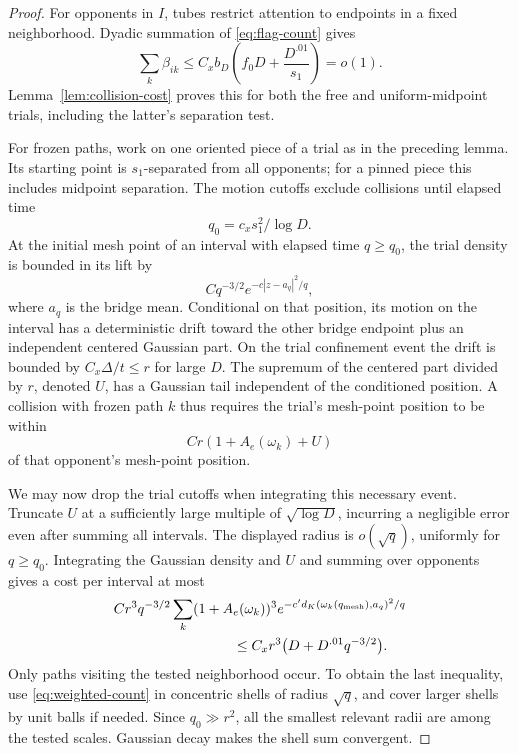 \begin{proof}
For opponents in $I$, tubes restrict attention to endpoints in a fixed
neighborhood.  Dyadic summation of \eqref{eq:flag-count} gives
\[
 \sum_k\beta_{ik}
       \le C_xb_D\left(f_0D+\frac{D^{.01}}{s_1}\right)=o(1).
\]
Lemma~\ref{lem:collision-cost} proves this for both the free and
uniform-midpoint trials, including the latter's separation test.

For frozen paths, work on one oriented piece of a trial as in the
preceding lemma.  Its starting point is $s_1$-separated from all
opponents; for a pinned piece this includes midpoint separation.
The motion cutoffs exclude collisions until elapsed time
\[
                        q_0=c_xs_1^2/\log D.
\]
At the initial mesh point of an interval with elapsed time $q\ge q_0$,
the trial density is bounded in its lift by
\[
                  Cq^{-3/2}e^{-c|z-a_q|^2/q},
\]
where $a_q$ is the bridge mean.  Conditional on that position, its
motion on the interval has a deterministic drift toward the other
bridge endpoint plus an independent centered Gaussian part.  On the
trial confinement event the drift is bounded by
$C_x\Delta/t\le r$ for large $D$.  The supremum of the centered
part divided by $r$, denoted $U$, has a Gaussian tail independent of
the conditioned position.  A collision with frozen path $k$ thus
requires the trial's mesh-point position to be within
\[
                        Cr(1+A_e(\omega_k)+U)
\]
of that opponent's mesh-point position.

We may now drop the trial cutoffs when integrating this necessary
event.  Truncate $U$ at a sufficiently large multiple of
$\sqrt{\log D}$, incurring a negligible error even after summing all
intervals.  The displayed radius is $o(\sqrt q)$, uniformly for
$q\ge q_0$.  Integrating the Gaussian density and $U$ and summing
over opponents gives a cost per interval at most
\begin{equation}\label{eq:frozen-one-interval}
\begin{split}
 &Cr^3q^{-3/2}\sum_k(1+A_e(\omega_k))^3
       e^{-c'd_K(\omega_k(q_{\rm mesh}),a_q)^2/q}\\
 &\hspace{30mm}\le C_xr^3\bigl(D+D^{.01}q^{-3/2}\bigr).
\end{split}
\end{equation}
Only paths visiting the tested neighborhood occur.  To obtain the
last inequality, use \eqref{eq:weighted-count} in concentric shells
of radius $\sqrt q$, and cover larger shells by unit balls if needed.
Since $q_0\gg r^2$, all the smallest relevant radii are among the
tested scales.  Gaussian decay makes the shell sum convergent.


\end{proof}
